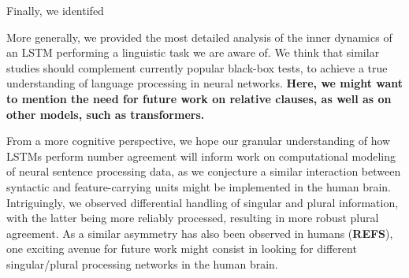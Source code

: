 Finally, we identifed 


More generally, we provided the most detailed analysis of the inner
dynamics of an LSTM performing a linguistic task we are aware of. We
think that similar studies should complement currently popular
black-box tests, to achieve a true understanding of language
processing in neural networks. \textbf{Here, we might want to mention
  the need for future work on relative clauses, as well as on other
  models, such as transformers.}

From a more cognitive perspective, we hope our granular
understanding of how LSTMs perform number agreement will inform work
on computational modeling of neural sentence processing data, as we
conjecture a similar interaction between syntactic and
feature-carrying units might be implemented in the human
brain. Intriguingly, we observed differential handling of singular and
plural information, with the latter being more reliably processed,
resulting in more robust plural agreement. As a similar asymmetry has
also been observed in humans (\textbf{REFS}), one exciting avenue for
future work might consist in looking for different singular/plural
processing networks in the human brain.
